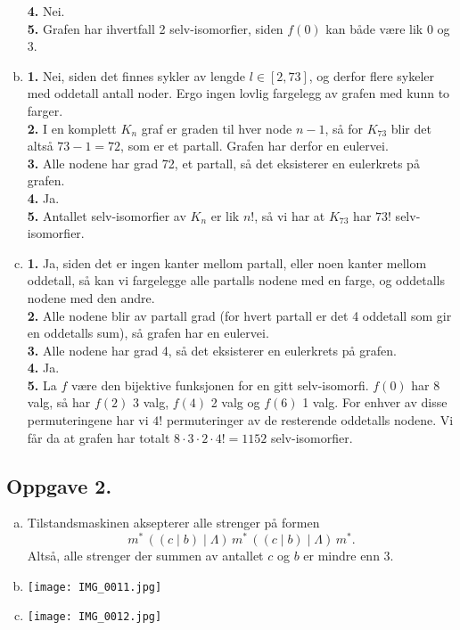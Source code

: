 \documentclass{article}
\begin{document}
\begin{enumerate}[(a)]
{        \textbf{4.} Nei. \\
        \textbf{5.} Grafen har ihvertfall 2 selv-isomorfier, siden $f(0)$ kan både være lik 0 og 3.
    }
    \item {
        \textbf{1.} Nei, siden det finnes sykler av lengde $l \in \left[2, 73\right]$, og derfor flere sykeler med oddetall antall noder. 
        Ergo ingen lovlig fargelegg av grafen med kunn to farger. \\
        \textbf{2.} I en komplett $K_n$ graf er graden til hver node $n-1$, så for $K_{73}$ blir det altså $73-1=72$, som er et partall.
        Grafen har derfor en eulervei. \\
        \textbf{3.} Alle nodene har grad 72, et partall, så det eksisterer en eulerkrets på grafen. \\
        \textbf{4.} Ja. \\
        \textbf{5.} Antallet selv-isomorfier av $K_n$ er lik $n!$, så vi har at $K_{73}$ har $73!$ selv-isomorfier.
    }
    \item {
        \textbf{1.} Ja, siden det er ingen kanter mellom partall, eller noen kanter mellom oddetall, så kan vi fargelegge 
        alle partalls nodene med en farge, og oddetalls nodene med den andre. \\
        \textbf{2.} Alle nodene blir av partall grad (for hvert partall er det 4 oddetall som gir en oddetalls sum),
        så grafen har en eulervei. \\
        \textbf{3.} Alle nodene har grad 4, så det eksisterer en eulerkrets på grafen. \\
        \textbf{4.} Ja. \\
        \textbf{5.} La $f$ være den bijektive funksjonen for en gitt selv-isomorfi. $f(0)$ har 8 valg, så har $f(2)$ 3 valg, $f(4)$ 2 valg og $f(6)$ 1 valg.
        For enhver av disse permuteringene har vi $4!$ permuteringer av de resterende oddetalls nodene. Vi får da at 
        grafen har totalt $8 \cdot 3 \cdot 2 \cdot 4! = 1152$ selv-isomorfier.
    }
\end{enumerate}

\subsection*{Oppgave 2.}
\begin{enumerate}[(a)]
    \item {
        Tilstandsmaskinen aksepterer alle strenger på formen 
        $$m^{*}\,((c \mid b) \mid \Lambda)\,m^{*}\,((c \mid b) \mid \Lambda)\,m^{*} \text{.}$$ 
        Altså, alle strenger der summen av antallet $c$ og $b$ er mindre enn 3.
    }
    \item \hphantom{.}
        \begin{center}
            \texttt{[image: IMG\_0011.jpg]}
        \end{center}
    \item \hphantom{.}
        \begin{center}
            \texttt{[image: IMG\_0012.jpg]}
        \end{center}
\end{enumerate}
\end{document}
